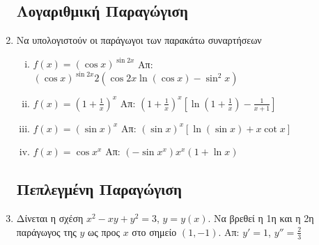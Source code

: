 \begin{enumerate}
    \subsection*{Λογαριθμική Παραγώγιση}

  \item  Να υπολογιστούν οι παράγωγοι των παρακάτω συναρτήσεων

    \begin{enumerate}[(i)]
      \item $ f(x) = (\cos{x})^{\sin{2x}} $ \hfill Απ: $
        (\cos{x})^{\sin{2x}} 2(\cos{2x} \ln{(\cos{x})} - \sin^{2}{x}) $
      \item $ f(x) = \left(1 + \frac{1}{x} \right)^{x} $ \hfill Απ: $
        \left(1 + \frac{1}{x}\right)^{x}\left[\ln{(1 + \frac{1}{x})} -
        \frac{1}{x+1}\right] $
      \item $ f(x)=(\sin{x})^{x} $ \hfill Απ: $ (\sin{x})^{x}[\ln{(\sin{x}
        )} + x \cot{x}] $ 
      \item $ f(x)=\cos{x}^{x} $ \hfill Απ: $ (- \sin{x^{x}})x^{x} (1 +
        \ln{x}) $
    \end{enumerate}


    \subsection*{Πεπλεγμένη Παραγώγιση}

    \item Δίνεται η σχέση $ x^{2} - xy + y^{2} = 3 $, $ y=y(x) $. Να βρεθεί η 1η
      και η 2η παράγωγος της $y$ ως προς $x$ στο σημείο $ (1,-1) $.
      \hfill Απ: $ y' = 1$, $ y'' = \frac{2}{3} $


\end{enumerate}

